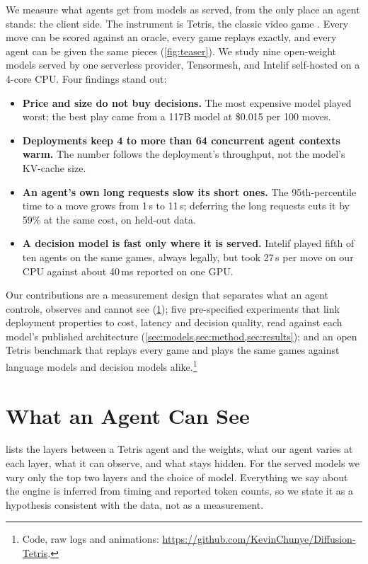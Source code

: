 \documentclass{article}
\begin{document}
We measure what agents get from models as served, from the only place an agent stands: the client side. The instrument is Tetris, the classic video game \citep{algorta}. Every move can be scored against an oracle, every game replays exactly, and every agent can be given the same pieces (\cref{fig:teaser}). We study nine open-weight models served by one serverless provider, Tensormesh, and Intelif self-hosted on a 4-core CPU. Four findings stand out:
\begin{itemize}\setlength\itemsep{1pt}
  \item \textbf{Price and size do not buy decisions.} The most expensive model played worst; the best play came from a 117B model at \$0.015 per 100 moves.
  \item \textbf{Deployments keep 4 to more than 64 concurrent agent contexts warm.} The number follows the deployment's throughput, not the model's KV-cache size.
  \item \textbf{An agent's own long requests slow its short ones.} The 95th-percentile time to a move grows from 1\,s to 11\,s; deferring the long requests cuts it by 59\% at the same cost, on held-out data.
  \item \textbf{A decision model is fast only where it is served.} Intelif played fifth of ten agents on the same games, always legally, but took 27\,s per move on our CPU against about 40\,ms reported on one GPU.
\end{itemize}
Our contributions are a measurement design that separates what an agent controls, observes and cannot see (\cref{sec:setup}); five pre-specified experiments that link deployment properties to cost, latency and decision quality, read against each model's published architecture (\cref{sec:models,sec:method,sec:results}); and an open Tetris benchmark that replays every game and plays the same games against language models and decision models alike.\footnote{Code, raw logs and animations: \url{https://github.com/KevinChunye/Diffusion-Tetris}.}

\section{What an Agent Can See}
\label{sec:setup}

 lists the layers between a Tetris agent and the weights, what our agent varies at each layer, what it can observe, and what stays hidden. For the served models we vary only the top two layers and the choice of model. Everything we say about the engine is inferred from timing and reported token counts, so we state it as a hypothesis consistent with the data, not as a measurement.
\end{document}
